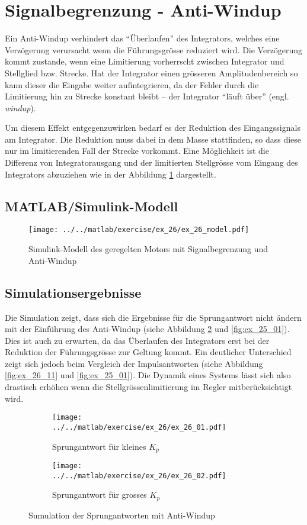 \section{Signalbegrenzung - Anti-Windup}
Ein Anti-Windup verhindert das ``Überlaufen'' des Integrators, welches eine
Verzögerung verursacht wenn die Führungsgrösse reduziert wird. Die Verzögerung
kommt zustande, wenn eine Limitierung vorherrscht zwischen Integrator und
Stellglied bzw. Strecke. Hat der Integrator einen grösseren Amplitudenbereich
so kann dieser die Eingabe weiter aufintegrieren, da der Fehler durch die
Limitierung hin zu Strecke konstant bleibt -- der Integrator ``läuft über''
(engl. \emph{windup}).

Um diesem Effekt entgegenzuwirken bedarf es der Reduktion des Eingangssignals
am Integrator. Die Reduktion muss dabei in dem Masse stattfinden, so dass
diese nur im limitierenden Fall der Strecke vorkommt. Eine Möglichkeit ist die
Differenz von Integratorausgang und der limitierten Stellgrösse vom Eingang
des Integrators abzuziehen wie in der Abbildung \ref{fig:ex_26_model}
dargestellt.

\subsection{MATLAB/Simulink-Modell}

\begin{figure}[h!]
	\centering
	\texttt{[image: ../../matlab/exercise/ex\_26/ex\_26\_model.pdf]}
	\caption{Simulink-Modell des geregelten Motors mit Signalbegrenzung
		und Anti-Windup}
	\label{fig:ex_26_model}
\end{figure}

\subsection{Simulationsergebnisse}
Die Simulation zeigt, dass sich die Ergebnisse für die Sprungantwort nicht
ändern mit der Einführung des Anti-Windup (siehe Abbildung \ref{fig:ex_26_01}
und \ref{fig:ex_25_01}). Dies ist auch zu erwarten, da das Überlaufen des
Integrators erst bei der Reduktion der Führungsgrösse zur Geltung kommt. 
Ein deutlicher Unterschied zeigt sich jedoch beim Vergleich der
Impulsantworten (siehe Abbildung \ref{fig:ex_26_11} und \ref{fig:ex_25_01}).
Die Dynamik eines Systems lässt sich also drastisch erhöhen wenn die
Stellgrössenlimitierung im Regler mitberücksichtigt wird.

\begin{figure}[h!]
	\centering
	\begin{subfigure}{0.45\textwidth}
		\texttt{[image: ../../matlab/exercise/ex\_26/ex\_26\_01.pdf]}
		\caption{Sprungantwort für kleines $K_p$}
		\label{fig:ex_26_01}
	\end{subfigure}
	\hfill{}
	\begin{subfigure}{0.45\textwidth}
		\texttt{[image: ../../matlab/exercise/ex\_26/ex\_26\_02.pdf]}
		\caption{Sprungantwort für grosses $K_p$}
	\end{subfigure}
	\caption{Sumulation der Sprungantworten mit Anti-Windup}
\end{figure}

